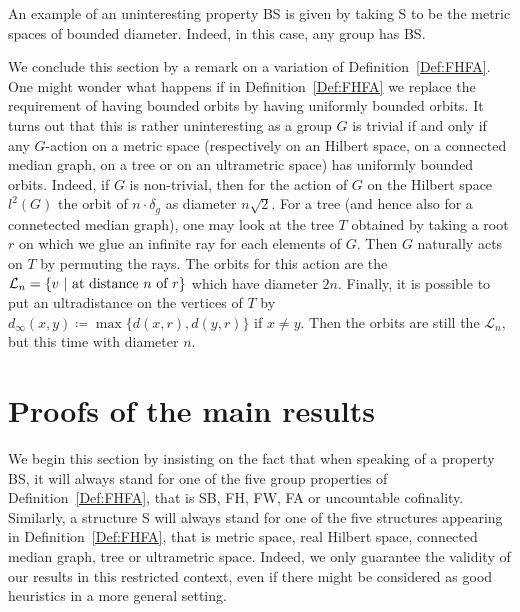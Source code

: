 \documentclass[a4paper]{article}
\theoremstyle{definition}
\theoremstyle{remark}%
\newcommand{\setst}[2]{\{#1\ |\ #2\}}
\begin{document}
%
%
An example of an uninteresting property BS is given by taking S to be the metric spaces of bounded diameter. Indeed, in this case, any group has BS.


We conclude this section by a remark on a variation of Definition~\ref{Def:FHFA}.
One might wonder what happens if in Definition~\ref{Def:FHFA} we replace the requirement of having bounded orbits by having uniformly bounded orbits.
It turns out that this is rather uninteresting as a group $G$ is trivial if and only if any $G$-action on a metric space (respectively on an Hilbert space, on a connected median graph, on a tree or on an ultrametric space) has uniformly bounded orbits.
Indeed, if $G$ is non-trivial, then for the action of $G$ on the Hilbert space $l^2(G)$ the orbit of $n\cdot \delta_g$ as diameter $n\sqrt2$.
For a tree (and hence also for a connetected median graph), one may look at the tree $T$ obtained by taking a root $r$ on which we glue an infinite ray for each elements of $G$. Then $G$ naturally acts on $T$ by permuting the rays. The orbits for this action are the $\mathcal L_n=\setst{v}{\textnormal{at distance $n$ of }r}$ which have diameter $2n$.
Finally, it is possible to put an ultradistance on the vertices of $T$ by  $d_\infty(x,y)\coloneqq\max\{d(x,r),d(y,r)\}$ if $x\neq y$. Then the orbits are still the $\mathcal L_n$, but this time with diameter $n$.
%
%
%
%
%
%
%
%
%
%
\section{Proofs of the main results}
\label{Section:Proof}
%
%
%
We begin this section by insisting on the fact that when speaking of a property BS, it will always stand for one of the five group properties of Definition~\ref{Def:FHFA}, that is SB, FH, FW, FA or uncountable cofinality.
Similarly, a structure S will always stand for one of the five structures appearing in Definition~\ref{Def:FHFA}, that is metric space, real Hilbert space, connected median graph, tree or ultrametric space.
Indeed, we only guarantee the validity of our results in this restricted context, even if there might be considered as good heuristics in a more general setting.
\end{document}
